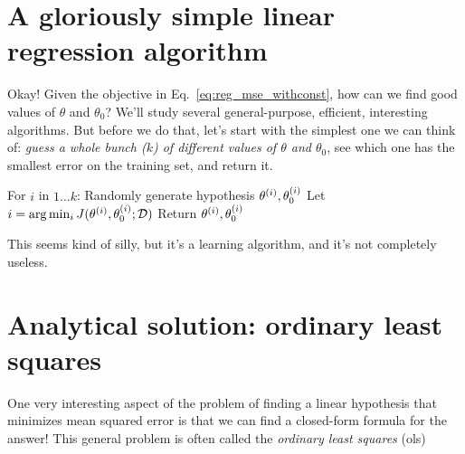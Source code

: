 

\section{A gloriously simple linear regression algorithm}

Okay!  Given the objective in Eq.~\ref{eq:reg_mse_withconst}, how
can we find good values of $\theta$ and $\theta_0$?  We'll study
several general-purpose, efficient, interesting algorithms.  But
before we do that, let's start with the simplest one we can think of:
{\em guess a whole bunch ($k$) of different values of $\theta$ and
$\theta_0$}, see which one has the smallest error on the training
set, and return it.

\begin{codebox}
  \li For $i$ in  $1\dots k$: Randomly generate hypothesis $\theta^{(i)},
    \theta_0^{(i)}$
  \li Let $i = {\rm arg}\min_{i} J(\theta^{(i)}, \theta_0^{(i)}; {\cal D})$
  \li Return $\theta^{(i)}, \theta_0^{(i)}$
\end{codebox}

This seems kind of silly, but it's a learning algorithm, and it's not
completely useless. 


\section{Analytical solution: ordinary least squares}

One very interesting aspect of the problem of finding a linear hypothesis
that minimizes mean squared error is that we can find a
closed-form formula for the answer! This general problem is often
called the {\em ordinary least squares} ({\sc ols})


